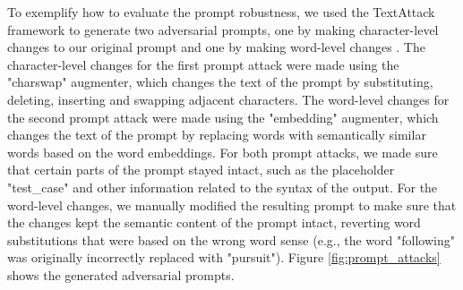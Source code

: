 \documentclass[a4paper]{article}
\begin{document}
To exemplify how to evaluate the prompt robustness, we used the TextAttack framework to generate two adversarial prompts, one by making character-level changes to our original prompt and one by making word-level changes \cite{morris2020textattack}. The character-level changes for the first prompt attack were made using the "charswap" augmenter, which changes the text of the prompt by substituting, deleting, inserting and swapping adjacent characters. The word-level changes for the second prompt attack were made using the "embedding" augmenter, which changes the text of the prompt by replacing words with semantically similar words based on the word embeddings. For both prompt attacks, we made sure that certain parts of the prompt stayed intact, such as the placeholder "\textlangle test\_case\textrangle" and other information related to the syntax of the output. For the word-level changes, we manually modified the resulting prompt to make sure that the changes kept the semantic content of the prompt intact, reverting word substitutions that were based on the wrong word sense (e.g., the word "following" was originally incorrectly replaced with "pursuit"). Figure \ref{fig:prompt_attacks} shows the generated adversarial prompts. 
\end{document}
